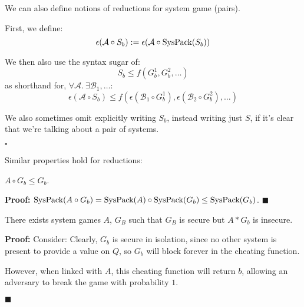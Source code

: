 \begin{definition}
We can also define notions of reductions for system game (pairs).

First, we define:
$$
\epsilon(\mathcal{A} \circ S_b) := \epsilon(\mathcal{A} \circ \text{SysPack}(S_b))
$$

We then also use the syntax sugar of:
$$
S_b \leq f(G_b^1, G_b^2, \ldots)
$$
as shorthand for, $\forall \mathcal{A}.\ \exists \mathcal{B}_1, \ldots$:
$$
\epsilon(\mathcal{A} \circ S_b) \leq f(\epsilon(\mathcal{B}_1 \circ G_b^1), \epsilon(\mathcal{B}_2 \circ G_b^2), \ldots)
$$

We also sometimes omit explicitly writing $S_b$, instead writing just $S$,
if it's clear that we're talking about a pair of systems.

$\square$
\end{definition}

Similar properties hold for reductions:

\begin{lemma}
$A \circ G_b \leq G_b$.

\textbf{Proof:} $\text{SysPack}(A \circ G_b) = \text{SysPack}(A) \circ \text{SysPack}(G_b) \leq \text{SysPack}(G_b)$. $\blacksquare$
\end{lemma}

\begin{lemma}
There exists system games $A$, $G_B$ such that $G_B$ is secure
but $A * G_b$ is insecure.

\textbf{Proof:}
Consider:
Clearly, $G_b$ is secure in isolation, since no other system is present
to provide a value on $Q$, so $G_b$ will block forever in the cheating function.

However, when linked with $A$, this cheating function will return $b$,
allowing an adversary to break the game with probability $1$.

$\blacksquare$
\end{lemma}
